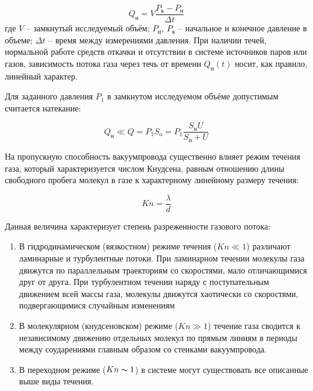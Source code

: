 \documentclass[a4paper, 12pt]{article} %
\begin{document}
\begin{equation}
    Q_{\text{н}} = V \frac{P_{\text{к}} - P_{\text{н}}}{\Delta t}
\end{equation}
где $V$ -- замкнутый исследуемый объём; $P_{\text{н}}$, $P_{\text{к}}$ -- начальное и конечное давление в объеме; $\Delta t$ -- время между измерениями давления. При наличии течей, нормальной работе средств откачки и отсутствии в системе
источников паров или газов, зависимость потока газа через течь от времени $Q_{\text{н}}(t)$ носит, как правило, линейный характер.

Для заданного давления $P_1$ в замкнутом исследуемом объёме допустимым считается натекание:

\begin{equation}
    Q_{\text{н}} \ll Q = P_1 S_{\text{o}} = P_1 \frac{S_{\text{н}} U}{S_{\text{н}} + U}
\end{equation}

На пропускную способность вакуумпровода существенно влияет
режим течения газа, который характеризуется числом Кнудсена, равным
отношению длины свободного пробега молекул в газе к характерному
линейному размеру течения:

\begin{equation}
    Kn = \frac{\lambda}{d}
\end{equation}

Данная величина характеризует степень разреженности газового
потока:
\begin{enumerate}

    \item В гидродинамическом (вязкостном) режиме течения ($Kn \ll 1$)
различают ламинарные и турбулентные потоки. При ламинарном
течении молекулы газа движутся по параллельным траекториям
со скоростями, мало отличающимися друг от друга. При турбулентном течении наряду с поступательным движением всей массы газа, молекулы движутся хаотически со скоростями, подвергающимися случайным изменениям

    \item В молекулярном (кнудсеновском) режиме ($Kn \gg 1$) течение газа
сводится к независимому движению отдельных молекул по прямым линиям в периоды между соударениями главным образом со
стенками вакуумпровода.

    \item В переходном режиме ($Kn \thicksim 1$) в системе могут существовать все
описанные выше виды течения.

\end{enumerate}
\end{document}
